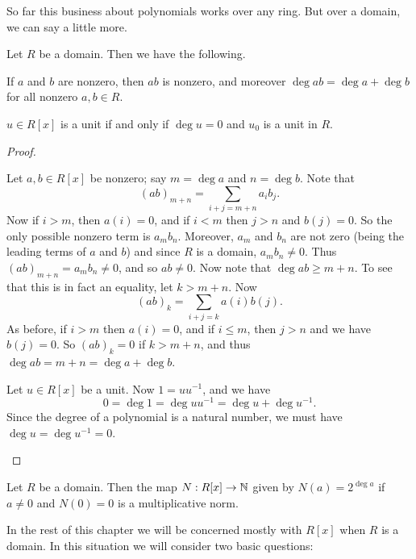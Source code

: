 So far this business about polynomials works over any ring. But over a domain, we can say a little more.

\begin{prop}
Let \(R\) be a domain. Then we have the following.
\begin{proplist*}
\item If \(a\) and \(b\) are nonzero, then \(ab\) is nonzero, and moreover \(\deg{ab} = \deg{a} + \deg{b}\) for all nonzero \(a,b \in R\).
\item \(u \in R[x]\) is a unit if and only if \(\deg{u} = 0\) and \(u_0\) is a unit in \(R\).
\end{proplist*}
\end{prop}

\begin{proof}
\begin{inlineproplist}
\item Let \(a,b \in R[x]\) be nonzero; say \(m = \deg{a}\) and \(n = \deg{b}\). Note that \[ (ab)_{m+n} = \sum_{i+j = m+n} a_ib_j. \] Now if \(i > m\), then \(a(i) = 0\), and if \(i < m\) then \(j > n\) and \(b(j) = 0\). So the only possible nonzero term is \(a_mb_n\). Moreover, \(a_m\) and \(b_n\) are not zero (being the leading terms of \(a\) and \(b\)) and since \(R\) is a domain, \(a_mb_n \neq 0\). Thus \((ab)_{m+n} = a_mb_n \neq 0\), and so \(ab \neq 0\). Now note that \(\deg{ab} \geq m+n\). To see that this is in fact an equality, let \(k > m+n\). Now \[ (ab)_k = \sum_{i+j = k} a(i)b(j). \] As before, if \(i > m\) then \(a(i) = 0\), and if \(i \leq m\), then \(j > n\) and we have \(b(j) = 0\). So \((ab)_k = 0\) if \(k > m+n\), and thus \(\deg{ab} = m+n = \deg{a} + \deg{b}\).
\item Let \(u \in R[x]\) be a unit. Now \(1 = uu^{-1}\), and we have \[ 0 = \deg{1} = \deg{uu^{-1}} = \deg{u} + \deg{u^{-1}}. \] Since the degree of a polynomial is a natural number, we must have \(\deg{u} = \deg{u^{-1}} = 0\).
\end{inlineproplist}
\end{proof}

\begin{cor}
Let \(R\) be a domain. Then the map \(N : R[x] \rightarrow \mathbb{N}\) given by \(N(a) = 2^{\deg{a}}\) if \(a \neq 0\) and \(N(0) = 0\) is a multiplicative norm.
\end{cor}

In the rest of this chapter we will be concerned mostly with \(R[x]\) when \(R\) is a domain. In this situation we will consider two basic questions:

